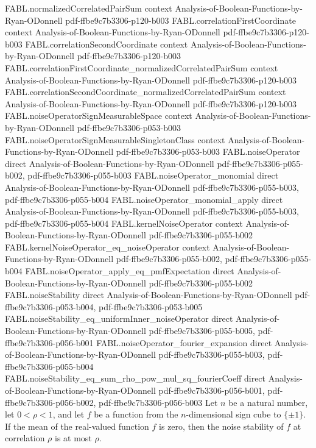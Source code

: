 \begin{theorem}
\proofstep
  {FABL.normalizedCorrelatedPairSum}
  {context}
  {Analysis-of-Boolean-Functions-by-Ryan-ODonnell}
  {pdf-ffbe9c7b3306-p120-b003}
\proofstep
  {FABL.correlationFirstCoordinate}
  {context}
  {Analysis-of-Boolean-Functions-by-Ryan-ODonnell}
  {pdf-ffbe9c7b3306-p120-b003}
\proofstep
  {FABL.correlationSecondCoordinate}
  {context}
  {Analysis-of-Boolean-Functions-by-Ryan-ODonnell}
  {pdf-ffbe9c7b3306-p120-b003}
\proofstep
  {FABL.correlationFirstCoordinate_normalizedCorrelatedPairSum}
  {context}
  {Analysis-of-Boolean-Functions-by-Ryan-ODonnell}
  {pdf-ffbe9c7b3306-p120-b003}
\proofstep
  {FABL.correlationSecondCoordinate_normalizedCorrelatedPairSum}
  {context}
  {Analysis-of-Boolean-Functions-by-Ryan-ODonnell}
  {pdf-ffbe9c7b3306-p120-b003}
\proofstep
  {FABL.noiseOperatorSignMeasurableSpace}
  {context}
  {Analysis-of-Boolean-Functions-by-Ryan-ODonnell}
  {pdf-ffbe9c7b3306-p053-b003}
\proofstep
  {FABL.noiseOperatorSignMeasurableSingletonClass}
  {context}
  {Analysis-of-Boolean-Functions-by-Ryan-ODonnell}
  {pdf-ffbe9c7b3306-p053-b003}
\proofstep
  {FABL.noiseOperator}
  {direct}
  {Analysis-of-Boolean-Functions-by-Ryan-ODonnell}
  {pdf-ffbe9c7b3306-p055-b002,
    pdf-ffbe9c7b3306-p055-b003}
\proofstep
  {FABL.noiseOperator_monomial}
  {direct}
  {Analysis-of-Boolean-Functions-by-Ryan-ODonnell}
  {pdf-ffbe9c7b3306-p055-b003,
    pdf-ffbe9c7b3306-p055-b004}
\proofstep
  {FABL.noiseOperator_monomial_apply}
  {direct}
  {Analysis-of-Boolean-Functions-by-Ryan-ODonnell}
  {pdf-ffbe9c7b3306-p055-b003,
    pdf-ffbe9c7b3306-p055-b004}
\proofstep
  {FABL.kernelNoiseOperator}
  {context}
  {Analysis-of-Boolean-Functions-by-Ryan-ODonnell}
  {pdf-ffbe9c7b3306-p055-b002}
\proofstep
  {FABL.kernelNoiseOperator_eq_noiseOperator}
  {context}
  {Analysis-of-Boolean-Functions-by-Ryan-ODonnell}
  {pdf-ffbe9c7b3306-p055-b002,
    pdf-ffbe9c7b3306-p055-b004}
\proofstep
  {FABL.noiseOperator_apply_eq_pmfExpectation}
  {direct}
  {Analysis-of-Boolean-Functions-by-Ryan-ODonnell}
  {pdf-ffbe9c7b3306-p055-b002}
\proofstep
  {FABL.noiseStability}
  {direct}
  {Analysis-of-Boolean-Functions-by-Ryan-ODonnell}
  {pdf-ffbe9c7b3306-p053-b004,
    pdf-ffbe9c7b3306-p053-b005}
\proofstep
  {FABL.noiseStability_eq_uniformInner_noiseOperator}
  {direct}
  {Analysis-of-Boolean-Functions-by-Ryan-ODonnell}
  {pdf-ffbe9c7b3306-p055-b005,
    pdf-ffbe9c7b3306-p056-b001}
\proofstep
  {FABL.noiseOperator_fourier_expansion}
  {direct}
  {Analysis-of-Boolean-Functions-by-Ryan-ODonnell}
  {pdf-ffbe9c7b3306-p055-b003,
    pdf-ffbe9c7b3306-p055-b004}
\proofstep
  {FABL.noiseStability_eq_sum_rho_pow_mul_sq_fourierCoeff}
  {direct}
  {Analysis-of-Boolean-Functions-by-Ryan-ODonnell}
  {pdf-ffbe9c7b3306-p056-b001,
    pdf-ffbe9c7b3306-p056-b002,
    pdf-ffbe9c7b3306-p056-b003}
Let $n$ be a natural number, let $0<\rho<1$, and let $f$ be a function from the
$n$-dimensional sign cube to $\{\pm1\}$. If the mean of the real-valued function $f$ is
zero, then the noise stability of $f$ at correlation $\rho$ is at most $\rho$.
\end{theorem}

